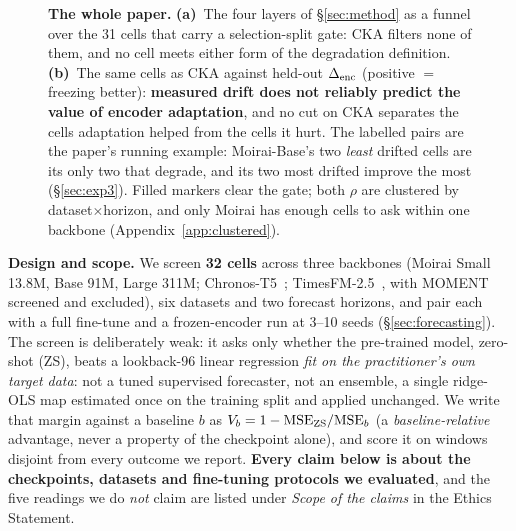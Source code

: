 \begin{figure}[t]
\caption{\textbf{The whole paper.}  \textbf{(a)}~The four
layers of \S\ref{sec:method} as a funnel over the 31 cells that carry a
selection-split gate: CKA filters none of them, and no cell meets either form of
the degradation definition.  \textbf{(b)}~The same cells as CKA against held-out
$\Delta_\text{enc}$ (positive ${=}$ freezing better): \textbf{measured drift does not
reliably predict the value of encoder adaptation}, and no cut on CKA separates the
cells adaptation helped from the cells it hurt.  The labelled pairs are the paper's
running example: Moirai-Base's two \emph{least} drifted cells are its only two
that degrade, and its two most drifted improve the most (\S\ref{sec:exp3}).  Filled
markers clear the gate; both $\rho$ are clustered by dataset${\times}$horizon, and
only Moirai has enough cells to ask within one backbone
(Appendix~\ref{app:clustered}).}
\label{fig:screen}
\end{figure}

\textbf{Design and scope.}  We screen \textbf{32 cells} across three backbones (Moirai
Small 13.8M, Base 91M, Large 311M; Chronos-T5~\cite{ansari2024chronos};
TimesFM-2.5~\cite{das2024timeseries}, with MOMENT~\cite{goswami2024moment}
screened and excluded), six datasets and two forecast horizons, and pair each with
a full fine-tune and a frozen-encoder run at 3--10 seeds
(\S\ref{sec:forecasting}).  The screen is deliberately weak: it asks only whether
the pre-trained model, zero-shot (ZS), beats a lookback-96 linear regression \emph{fit
on the practitioner's own target data}: not a tuned supervised forecaster, not an
ensemble, a single ridge-OLS map estimated once on the training split and applied
unchanged.  We write that margin against a baseline $b$ as
$V_{b} = 1 - \text{MSE}_{\text{ZS}}/\text{MSE}_{b}$ (a \emph{baseline-relative}
advantage, never a property of the checkpoint alone), and score it on windows
disjoint from every outcome we report.  \textbf{Every claim below is about the
checkpoints, datasets and fine-tuning protocols we evaluated}, and the five
readings we do \emph{not} claim are listed under \emph{Scope of the claims} in the
Ethics Statement.

